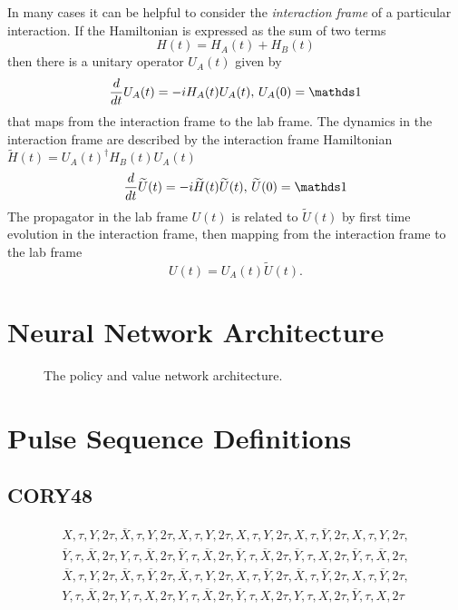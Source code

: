 In many cases it can be helpful to consider the \emph{interaction frame} of a particular interaction. If the Hamiltonian is expressed as the sum of two terms
\[
H(t) = H_A(t) + H_B(t)
\]
then there is a unitary operator $U_A(t)$ given by
\begin{equation}\label{eq:interaction-propagator}
    \frac{d}{dt} U_A(t) = -i H_A(t) U_A(t), \, U_A(0) = \identity
\end{equation}
that maps from the interaction frame to the lab frame.
The dynamics in the interaction frame are described by the interaction frame Hamiltonian $\widetilde{H}(t) = {U_A(t)}^{\dagger} H_B(t)U_A(t)$
\[
\frac{d}{dt}\widetilde{U}(t) = -i \widetilde{H}(t)\widetilde{U}(t),\, \widetilde{U}(0) = \identity
\]
The propagator in the lab frame $U(t)$ is related to $\widetilde{U}(t)$ by first time evolution in the interaction frame, then mapping from the interaction frame to the lab frame
\[
U(t) = U_A(t)\widetilde{U}(t).
\]

\section{Neural Network Architecture}

\begin{figure}[H]
    \centering
    
    \caption{The policy and value network architecture.}
    \label{fig:nn}
\end{figure}

\section{Pulse Sequence Definitions}

\subsection{CORY48}


\begin{equation*}
\begin{aligned}
    X, \tau, Y, 2\tau, \overline{X}, \tau, Y, 2\tau, X, \tau, Y, 2\tau,
    X, \tau, Y, 2\tau, X, \tau, \overline{Y}, 2\tau, X, \tau, Y, 2\tau, \\
    \overline{Y}, \tau, \overline{X}, 2\tau, Y, \tau, \overline{X}, 2\tau,
    \overline{Y}, \tau, \overline{X}, 2\tau, \overline{Y}, \tau, \overline{X},
    2\tau, \overline{Y}, \tau, X, 2\tau, \overline{Y}, \tau, \overline{X},
    2\tau, \\
    \overline{X}, \tau, Y, 2\tau, \overline{X}, \tau, \overline{Y}, 2\tau,
    \overline{X}, \tau, Y, 2\tau, X, \tau, \overline{Y}, 2\tau, \overline{X},
    \tau, \overline{Y}, 2\tau, X, \tau, \overline{Y}, 2\tau, \\
    Y, \tau, \overline{X}, 2\tau, Y, \tau, X, 2\tau, Y, \tau, \overline{X}, 2\tau, \overline{Y}, \tau, X, 2\tau, Y, \tau, X, 2\tau, \overline{Y}, \tau, X, 2\tau
\end{aligned}
\end{equation*}

